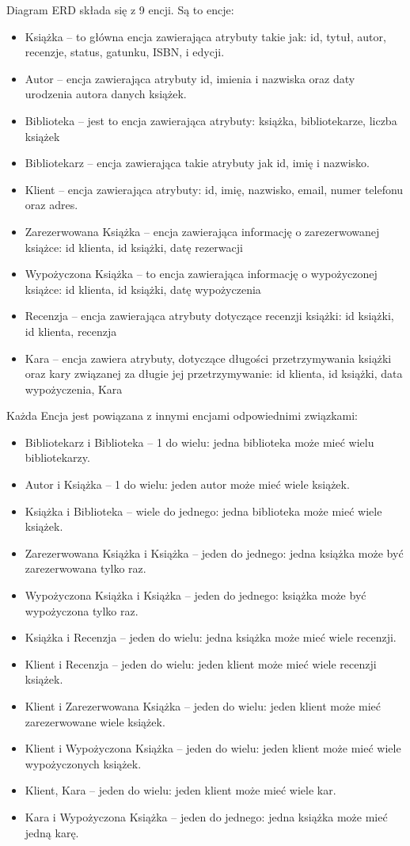 \documentclass[12pt]{article}
\begin{document}
Diagram ERD składa się z 9 encji.
Są to encje:
\begin{itemize}
    \item Książka – to główna encja zawierająca atrybuty takie jak: id, tytuł, autor, recenzje, status,  gatunku, ISBN, i edycji.
    \item Autor – encja zawierająca atrybuty id, imienia i nazwiska oraz daty urodzenia autora danych książek.
    \item Biblioteka – jest to encja zawierająca atrybuty: książka, bibliotekarze, liczba książek
    \item Bibliotekarz – encja zawierająca takie atrybuty jak id, imię i nazwisko.
    \item Klient – encja zawierająca atrybuty: id, imię, nazwisko, email, numer telefonu oraz adres.
    \item Zarezerwowana Książka – encja zawierająca informację o zarezerwowanej książce: id klienta, id książki, datę rezerwacji
    \item Wypożyczona Książka – to encja zawierająca informację o wypożyczonej książce: id klienta, id książki, datę wypożyczenia
    \item Recenzja – encja zawierająca atrybuty dotyczące recenzji książki: id książki, id klienta, recenzja
    \item Kara – encja zawiera atrybuty, dotyczące długości przetrzymywania książki oraz kary związanej za długie jej przetrzymywanie: id klienta, id książki, data wypożyczenia, Kara
\end{itemize}
Każda Encja jest powiązana z innymi encjami odpowiednimi związkami:

\begin{itemize}
    \item Bibliotekarz i Biblioteka – 1 do wielu: jedna biblioteka może mieć wielu bibliotekarzy.
    \item Autor i Książka – 1 do wielu: jeden autor może mieć wiele książek.
    \item Książka i Biblioteka – wiele do jednego: jedna biblioteka może mieć wiele książek.
    \item Zarezerwowana Książka i Książka – jeden do jednego: jedna książka może być zarezerwowana tylko raz.
    \item Wypożyczona Książka i Książka – jeden do jednego: książka może być wypożyczona tylko raz.
    \item Książka i Recenzja – jeden do wielu: jedna książka może mieć wiele recenzji.
    \item Klient i Recenzja – jeden do wielu: jeden klient może mieć wiele recenzji książek.
    \item Klient i Zarezerwowana Książka – jeden do wielu: jeden klient może mieć zarezerwowane wiele książek.
    \item Klient i Wypożyczona Książka – jeden do wielu: jeden klient może mieć wiele wypożyczonych książek.
    \item Klient, Kara – jeden do wielu: jeden klient może mieć wiele kar.
    \item Kara i Wypożyczona Książka – jeden do jednego: jedna książka może mieć jedną karę.
\end{itemize}
\end{document}
